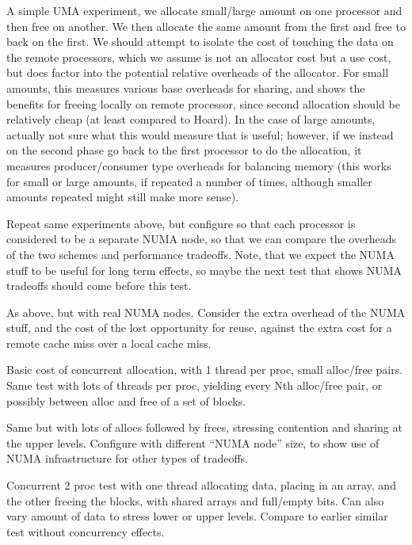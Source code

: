 \documentclass[dvips,11pt]{article}
\begin{document}
A simple UMA experiment, we allocate small/large amount on one processor
and then free on another.  We then allocate the same amount from the first
and free to back on the first.  We should attempt to isolate the cost of
touching the data on the remote processors, which we assume is not an
allocator cost but a use cost, but does factor into the potential relative
overheads of the allocator.  For small amounts, this measures various base
overheads for sharing, and shows the benefits for freeing locally on remote 
processor, since second allocation should be relatively cheap (at least
compared to Hoard).  In the case of large amounts, actually not sure what
this would measure that is useful; however, if we instead on the second
phase go back to the first processor to do the allocation, it measures
producer/consumer type overheads for balancing memory (this works for small 
or large amounts, if repeated a number of times, although smaller amounts
repeated might still make more sense).

Repeat same experiments above, but configure so that each processor is
considered to be a separate NUMA node, so that we can compare the overheads 
of the two schemes and performance tradeoffs.  Note, that we expect the
NUMA stuff to be useful for long term effects, so maybe the next test that
shows NUMA tradeoffs should come before this test.

As above, but with real NUMA nodes.  Consider the extra overhead of the
NUMA stuff, and the cost of the lost opportunity for reuse, against the
extra cost for a remote cache miss over a local cache miss.

Basic cost of concurrent allocation, with 1 thread per proc, small
alloc/free pairs.  Same test with lots of threads per proc, yielding every
Nth alloc/free pair, or possibly between alloc and free of a set of blocks.

Same but with lots of allocs followed by frees, stressing contention and
sharing at the upper levels.  Configure with different ``NUMA node'' size,
to show use of NUMA infrastructure for other types of tradeoffs.

Concurrent 2 proc test with one thread allocating data, placing in an
array, and the other freeing the blocks, with shared arrays and full/empty
bits.  Can also vary amount of data to stress lower or upper levels.
Compare to earlier similar test without concurrency effects.
\end{document}
